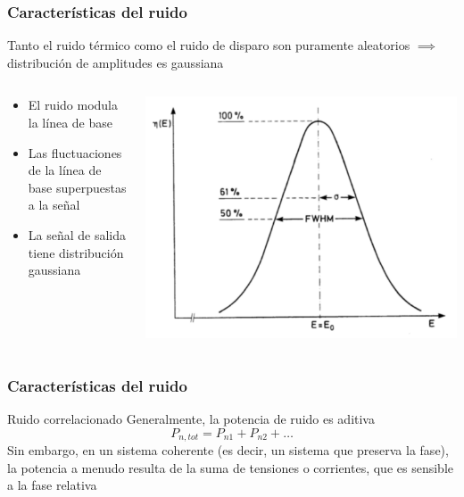 \documentclass{beamer}
\begin{document}
\begin{frame}
\frametitle{Características del ruido}
\begin{block}{}
Tanto el ruido térmico como el ruido de disparo son puramente aleatorios $\implies$ 
distribución de amplitudes es gaussiana
\end{block}
\begin{columns}
\begin{column}{0.5\textwidth}
\begin{block}{}
\begin{itemize}
\item El ruido modula la línea de base
\item Las fluctuaciones de la línea de base superpuestas a la señal
\item La señal de salida tiene distribución gaussiana
\end{itemize}
\end{block}
\end{column}
\begin{column}{0.5\textwidth}
\includegraphics[width=\textwidth]{d1/white_noise_gauss}
\end{column}
\end{columns}
\end{frame} 

\begin{frame}
\frametitle{Características del ruido}
\begin{block}{Ruido correlacionado}
Generalmente, la potencia de ruido es aditiva
$$P_{n,tot} = P_{n1} + P_{n2} + \ldots$$
Sin embargo, en un sistema coherente (es decir, un sistema que preserva la fase), 
la potencia a menudo resulta de la suma de tensiones o corrientes, que es 
sensible a la fase relativa
\end{block}
\end{frame} 
\end{document}
